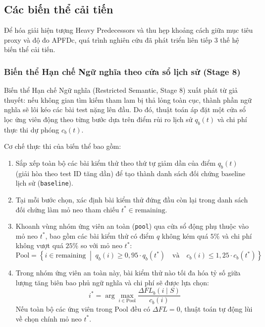 \subsection{Các biến thể cải tiến}
\label{subsec:improved_variants}

Để hóa giải hiện tượng Heavy Predecessors và thu hẹp khoảng cách giữa mục tiêu proxy và độ đo APFDc, quá trình nghiên cứu đã phát triển liên tiếp 3 thế hệ biến thể cải tiến.

\subsubsection{Biến thể Hạn chế Ngữ nghĩa theo cửa sổ lịch sử (Stage 8)}
\label{subsubsec:restricted_semantic}

Biến thể Hạn chế Ngữ nghĩa (Restricted Semantic, Stage 8) xuất phát từ giả thuyết: nếu không gian tìm kiếm tham lam bị thả lỏng toàn cục, thành phần ngữ nghĩa sẽ lôi kéo các bài test nặng lên đầu. Do đó, thuật toán áp đặt một cửa sổ lọc ứng viên động theo từng bước dựa trên điểm rủi ro lịch sử $q_b(t)$ và chi phí thực thi dự phóng $c_b(t)$.

Cơ chế thực thi của biến thể bao gồm:
\begin{enumerate}
    \item Sắp xếp toàn bộ các bài kiểm thử theo thứ tự giảm dần của điểm $q_b(t)$ (giải hòa theo test ID tăng dần) để tạo thành danh sách đối chứng baseline lịch sử (\texttt{baseline}).
    \item Tại mỗi bước chọn, xác định bài kiểm thử đứng đầu còn lại trong danh sách đối chứng làm mỏ neo tham chiếu $t^* \in \text{remaining}$.
    \item Khoanh vùng nhóm ứng viên an toàn (\texttt{pool}) qua cửa sổ động phụ thuộc vào mỏ neo $t^*$, bao gồm các bài kiểm thử có điểm $q$ không kém quá $5\%$ và chi phí không vượt quá $25\%$ so với mỏ neo $t^*$:
    \begin{equation}
    \label{eq:restricted_pool}
    \text{Pool} = \left\{ i \in \text{remaining} \;\middle|\; q_b(i) \ge 0{,}95 \cdot q_b(t^*) \quad \text{và} \quad c_b(i) \le 1{,}25 \cdot c_b(t^*) \right\}
    \end{equation}
    \item Trong nhóm ứng viên an toàn này, bài kiểm thử nào tối đa hóa tỷ số giữa lượng tăng biên bao phủ ngữ nghĩa và chi phí sẽ được lựa chọn:
    \begin{equation}
    \label{eq:restricted_choice}
    i^* = \arg\max_{i \in \text{Pool}} \frac{\Delta FL_b(i \mid S)}{c_b(i)}
    \end{equation}
    Nếu toàn bộ các ứng viên trong Pool đều có $\Delta FL = 0$, thuật toán tự động lùi về chọn chính mỏ neo $t^*$.
\end{enumerate}

